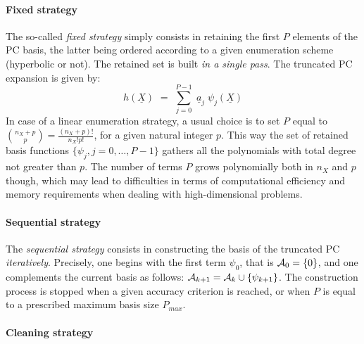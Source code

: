 {\paragraph*{Fixed strategy\\}

The so-called \emph{fixed strategy} simply consists in retaining the first $P$ elements of the PC basis, the latter being ordered according to a given enumeration scheme (hyperbolic or not). The retained set is built \emph{in a single pass}. The truncated PC expansion is given by:
\begin{equation} 
    \widehat{h}(\underline{X}) \, \, = \, \, \sum_{j=0}^{P-1} \; \underline{a}_{j} \; \psi_{j}(\underline{X})
\end{equation}
In case of a linear enumeration strategy, a usual choice is to set $P$ equal to $\binom{n_X+p}{p} = \frac{(n_X+p)!}{n_X!p!}$, for a given natural integer $p$. This way the set of retained basis functions $\{\psi_{j},j=0,\dots,P-1\}$ gathers all the polynomials with total degree not greater than $p$. The number of terms $P$ grows polynomially both in $n_X$ and $p$ though, which may lead to difficulties in terms of computational efficiency and memory requirements when dealing with high-dimensional problems. 

\paragraph*{Sequential strategy\\}

The \emph{sequential strategy} consists in constructing the basis of the truncated PC \emph{iteratively}. Precisely, one begins with the first term $\psi_0$, that is $\mathcal{A}_{0} = \{0\}$, and one complements the current basis as follows: $\mathcal{A}_{k+1} = \mathcal{A}_{k} \cup \{\psi_{k+1}\}$. The construction process is stopped when a given accuracy criterion is reached, or when $P$ is equal to a prescribed maximum basis size $P_{max}$.

\paragraph*{Cleaning strategy\\}

}

